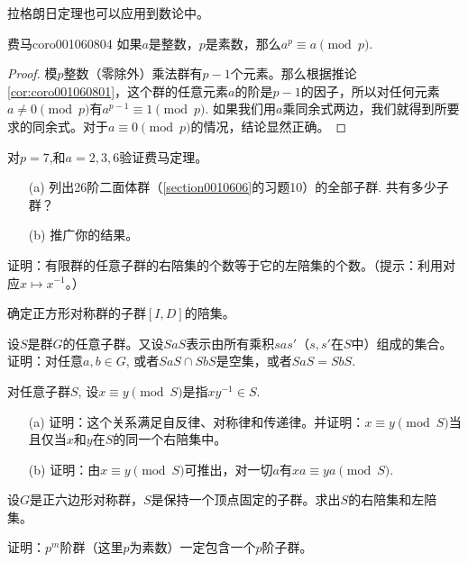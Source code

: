 拉格朗日定理也可以应用到数论中。
\begin{corollary}{费马}{coro001060804}
如果$a$是整数，$p$是素数，那么$a^p \equiv a \pmod{p}$.
\end{corollary}

\begin{proof}
模$p$整数（零除外）乘法群有$p-1$个元素。那么根据推论\ref{cor:coro001060801}，这个群的任意元素$a$的阶是$p-1$的因子，所以对任何元素$a \neq 0 \pmod{p}$有$a^{p-1}\equiv 1 \pmod{p}$. 如果我们用$a$乘同余式两边，我们就得到所要求的同余式。对于$a \equiv 0 \pmod{p}$的情况，结论显然正确。
\end{proof}

\begin{problemset}
\item 对$p=7$,和$a=2,3,6$验证费马定理。

\item \begin{enumerate}
\item[(a)] 列出26阶二面体群（\ref{section0010606}的习题10）的全部子群. 共有多少子群？
\item[(b)] 推广你的结果。 
\end{enumerate}

\item 证明：有限群的任意子群的右陪集的个数等于它的左陪集的个数。（提示：利用对应$x \mapsto x^{-1}$。）

\item 确定正方形对称群的子群$[I, D]$的陪集。

\item 设$S$是群$G$的任意子群。又设$SaS$表示由所有乘积$sas'$（$s,s'$在$S$中）组成的集合。证明：对任意$a, b \in G$, 或者$SaS \cap SbS$是空集，或者$SaS = SbS$.

\item 对任意子群$S$, 设$x \equiv y \pmod{S}$是指$xy^{-1} \in S$.
\begin{enumerate}
\item[(a)] 证明：这个关系满足自反律、对称律和传递律。并证明：$x \equiv y \pmod{S}$当且仅当$x$和$y$在$S$的同一个右陪集中。
\item[(b)] 证明：由$x \equiv y \pmod{S}$可推出，对一切$a$有$xa \equiv ya \pmod{S}$.
\end{enumerate}

\item 设$G$是正六边形对称群，$S$是保持一个顶点固定的子群。求出$S$的右陪集和左陪集。

\item 证明：$p^m$阶群（这里$p$为素数）一定包含一个$p$阶子群。


\end{problemset}
